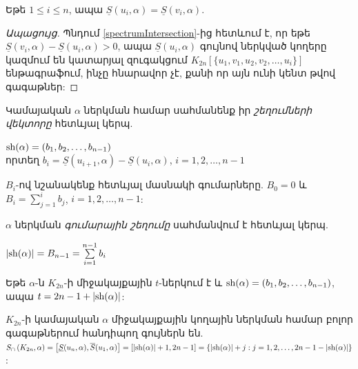 \begin{lemma}
Եթե $1 \leq i \leq n$, ապա $\underline{S}(u_i, \alpha) = \underline{S}(v_i, \alpha)$.
\end{lemma}
\begin{proof}[Ապացույց]
Պնդում \ref{spectrumIntersection}-ից հետևում է, որ եթե $\underline{S}(v_i, \alpha) - \underline{S}(u_{i}, \alpha) > 0$, ապա $\underline{S}(u_{i}, \alpha)$ գույնով ներկված կողերը կազմում են կատարյալ զուգակցում $K_{2n}\left[\{u_1,v_1,u_2,v_2,\ldots,u_i\}\right]$ ենթագրաֆում, ինչը հնարավոր չէ, քանի որ այն ունի կենտ թվով գագաթներ:
\end{proof}

Կամայական $\alpha$ ներկման համար սահմանենք իր \textit{շեղումների վեկտորը} հետևյալ կերպ.
\begin{center}
${\rm sh}(\alpha) = (b_1, b_2, \ldots, b_{n-1})$ \\
որտեղ $b_i = \underline{S}(u_{i+1}, \alpha) - \underline{S}(u_i, \alpha)$, $i=1,2,\ldots,n-1$
\end{center}

$B_i$-ով նշանակենք հետևյալ մասնակի գումարները. $B_0 = 0$ և $B_i = \sum\limits_{j=1}^{i}b_j$, $i=1,2,\ldots,n-1$:

$\alpha$ ներկման \textit{գումարային շեղումը} սահմանվում է հետևյալ կերպ.

\begin{center}
$|{\rm sh}(\alpha)| = B_{n-1} = \sum\limits_{i=1}^{n-1}b_i$
\end{center}

\begin{remark}
\label{totalShift}
Եթե $\alpha$-ն $K_{2n}$-ի միջակայքային $t$-ներկում է և ${\rm sh}(\alpha) = (b_1, b_2, \ldots, b_{n-1})$, ապա $t = 2n-1 + |{\rm sh}(\alpha)|$:
\end{remark}

\begin{remark}
\label{middleColors}
$K_{2n}$-ի կամայական $\alpha$ միջակայքային կողային ներկման համար բոլոր գագաթներում հանդիպող գույներն են. $S_\cap\left(K_{2n}, \alpha\right) = \left[\underline{S}(u_n, \alpha), \overline{S}(u_1, \alpha)\right] = \left[|{\rm sh}(\alpha)|+1, 2n-1\right] = \left\{|{\rm sh}(\alpha)|+j  : j=1,2,\ldots,2n-1-|{\rm sh}(\alpha)|\right\}$:
\end{remark}

